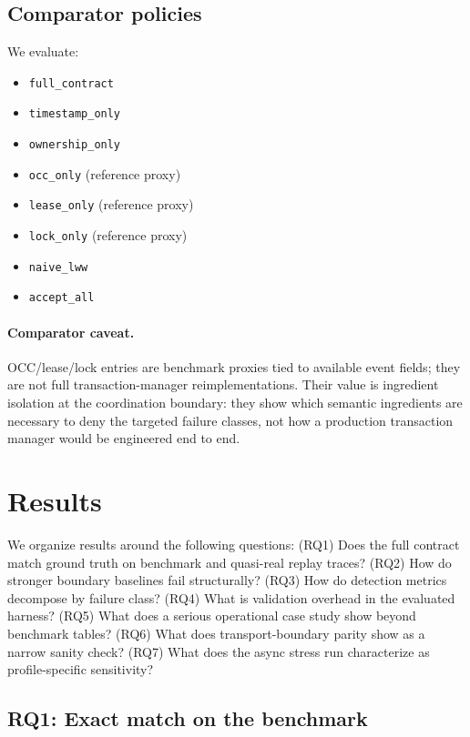 \documentclass[11pt]{article}
\begin{document}
\subsection{Comparator policies}

We evaluate:
\begin{itemize}[leftmargin=1.5em]
\item \texttt{full\_contract}
\item \texttt{timestamp\_only}
\item \texttt{ownership\_only}
\item \texttt{occ\_only} (reference proxy)
\item \texttt{lease\_only} (reference proxy)
\item \texttt{lock\_only} (reference proxy)
\item \texttt{naive\_lww}
\item \texttt{accept\_all}
\end{itemize}

\paragraph{Comparator caveat.}
OCC/lease/lock entries are benchmark proxies tied to available event fields; they are not full transaction-manager reimplementations. Their value is ingredient isolation at the coordination boundary: they show which semantic ingredients are necessary to deny the targeted failure classes, not how a production transaction manager would be engineered end to end.

\section{Results}

We organize results around the following questions: (RQ1) Does the full contract match ground truth on benchmark and quasi-real replay traces? (RQ2) How do stronger boundary baselines fail structurally? (RQ3) How do detection metrics decompose by failure class? (RQ4) What is validation overhead in the evaluated harness? (RQ5) What does a serious operational case study show beyond benchmark tables? (RQ6) What does transport-boundary parity show as a narrow sanity check? (RQ7) What does the async stress run characterize as profile-specific sensitivity?

\subsection{RQ1: Exact match on the benchmark}
\end{document}
